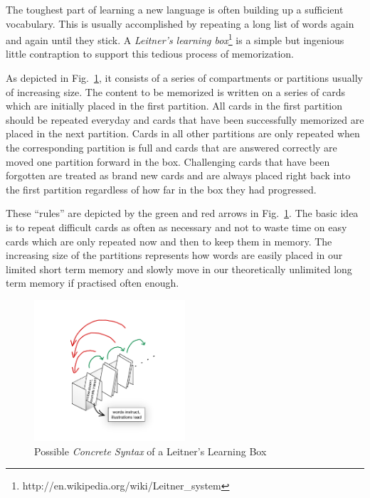 \genHeader


The toughest part of learning a new language  is often building up a sufficient vocabulary. This is usually accomplished by repeating a long list of words again
and again until they stick. A \emph{Leitner's learning box}\footnote{http://en.wikipedia.org/wiki/Leitner\_system} is a simple but ingenious little contraption
to support this tedious process of memorization.

As depicted in Fig.~\ref{fig:membox_illustration}, it consists of a series of compartments or partitions usually of increasing size. The content to be memorized
is written on a series of cards  which are initially placed in the first partition. All cards in the first  partition should be repeated everyday and cards that
have been successfully memorized are placed in the next partition. Cards in all other partitions are only repeated when the corresponding partition is full and
cards that are  answered correctly are moved one partition forward in the box. Challenging  cards that have been forgotten are treated as brand new cards and
are always  placed right back into the first partition regardless of how far in the box they  had progressed.

These ``rules'' are depicted by the green and red arrows in Fig.~\ref{fig:membox_illustration}. The basic idea is to repeat difficult cards as often as
necessary and not to waste time on easy cards which are only repeated now and then to keep them in memory. The increasing size of the partitions represents how
words are easily placed in our limited short term memory and slowly move in our theoretically unlimited long term memory if practised often enough.

 \begin{figure}[htp]
 \begin{center}
   \includegraphics[width=0.5\textwidth]{../membox_illustration}
   \caption[]{Possible \emph{Concrete Syntax} of a Leitner's Learning Box}
   \label{fig:membox_illustration}
 \end{center}
 \end{figure}
 \FloatBarrier

